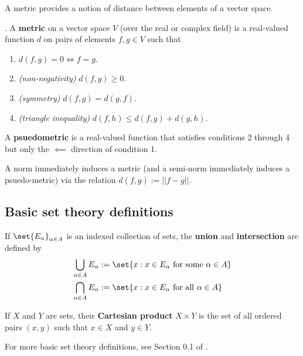 \documentclass{article} %
\begin{document}
A metric provides a notion of distance between elements of a vector space. 


\begin{definition} \cite[pp.87]{ash2000probability}. 
A \textbf{metric} on a vector space $V$ (over the real or complex field) is a real-valued function $d$ on pairs of elements $f,g  \in V$ such that  
\begin{enumerate}
\item $d(f,g) =0 \iff f=g$.
\item \textit{(non-negativity)} $d(f,g) \geq 0$. 
\item \textit{(symmetry)} $d(f,g)=d(g,f)$.
\item \textit{(triangle inequality)} $d(f,h) \leq d(f,g)+ d(g,h)$.
\end{enumerate}
A \textbf{psuedometric} is a real-valued function that satisfies conditions 2 through 4 but only the $\impliedby$ direction of condition 1.
\label{def:metric_and_psuedometric}
\end{definition}

A norm immediately induces a metric (and a semi-norm immediately induces a psuedo-metric) via the relation $d(f,g) := ||f-g||$.

\subsection{Basic set theory definitions}

\begin{definition}
If $\set{E_\alpha}_{\alpha \in A}$ is an indexed collection of sets, the \textbf{union} and \textbf{intersection} are defined by
\begin{align*}
\bigcup_{\alpha \in A} E_\alpha & := \set{x : x \in E_\alpha \text{ for some } \alpha \in A} \\
\bigcap_{\alpha \in A} E_\alpha & := \set{x : x \in E_\alpha \text{ for all } \alpha \in A} 
\end{align*}

\end{definition}

\begin{definition}
If $X$ and $Y$ are sets, their \textbf{Cartesian product} $X \times Y$ is the set of all ordered pairs $(x,y)$ such that $x \in X$ and $y \in Y$.
\label{def:cartesian_product}	
\end{definition}

For more basic set theory definitions, see Section 0.1 of \cite{folland1999real}.
\end{document}
